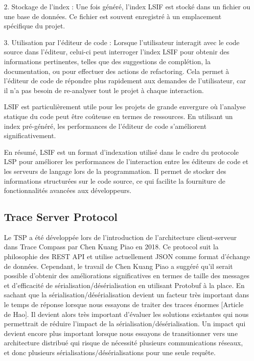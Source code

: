 2. Stockage de l'index : Une fois généré, l'index LSIF est stocké dans un fichier ou une base de données. Ce fichier est souvent enregistré à un emplacement spécifique du projet.

3. Utilisation par l'éditeur de code : Lorsque l'utilisateur interagit avec le code source dans l'éditeur, celui-ci peut interroger l'index LSIF pour obtenir des informations pertinentes, telles que des suggestions de complétion, la documentation, ou pour effectuer des actions de refactoring. Cela permet à l'éditeur de code de répondre plus rapidement aux demandes de l'utilisateur, car il n'a pas besoin de re-analyser tout le projet à chaque interaction.

LSIF est particulièrement utile pour les projets de grande envergure où l'analyse statique du code peut être coûteuse en termes de ressources. En utilisant un index pré-généré, les performances de l'éditeur de code s'améliorent significativement.

En résumé, LSIF est un format d'indexation utilisé dans le cadre du protocole LSP pour améliorer les performances de l'interaction entre les éditeurs de code et les serveurs de langage lors de la programmation. Il permet de stocker des informations structurées sur le code source, ce qui facilite la fourniture de fonctionnalités avancées aux développeurs.


\subsection{Trace Server Protocol}

Le TSP a été développée lors de l'introduction de l'architecture client-serveur dans Trace Compass par Chen Kuang Piao en 2018. Ce protocol suit la philosophie des REST API et utilise actuellement JSON comme format d'échange de données. Cependant, le travail de Chen Kuang Piao a suggéré qu'il serait possible d'obtenir des améliorations significatives en termes de taille des messages et d'efficacité de sérialisation/désérialisation en utilisant Protobuf à la place. En sachant que la sérialisation/désérialisation devient un facteur très important dans le temps de réponse lorsque nous essayons de traiter des traces énormes [Article de Hao]. Il devient alors très important d'évaluer les solutions existantes qui nous permettrait de réduire l'impact de la sérialisation/désérialisation. Un impact qui devient encore plus important lorsque nous essayons de transitionner vers une architecture distribué qui risque de nécessité plusieurs communications réseaux, et donc plusieurs sérialisations/désérialisations pour une seule requête.

